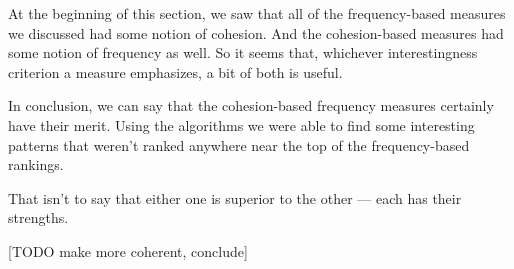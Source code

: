At the beginning of this section, we saw that all of the frequency-based measures we discussed had some notion of cohesion. And the cohesion-based measures had some notion of frequency as well. So it seems that, whichever interestingness criterion a measure emphasizes, a bit of both is useful.

In conclusion, we can say that the cohesion-based frequency measures certainly have their merit. Using the algorithms we were able to find some interesting patterns that weren't ranked anywhere near the top of the frequency-based rankings.

That isn't to say that either one is superior to the other --- each has their strengths.

[TODO make more coherent, conclude]

